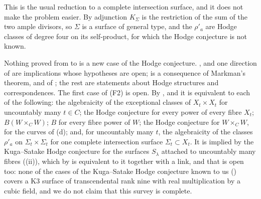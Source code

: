This is the usual reduction to a complete intersection surface, and it does
not make the problem easier. By adjunction $K_{\Sigma}$ is the restriction of
the sum of the two ample divisors, so $\Sigma$ is a surface of general type,
and the $\rho'_{a}$ are Hodge classes of degree four on its self-product, for
which the Hodge conjecture is not known.

\begin{remark}\label{rem:mumfordpowersopen}
Nothing proved from  to  is
a new case of the Hodge conjecture. ,
 and one direction of 
are implications whose hypotheses are open;  is a
consequence of Markman's theorem, and of \cite{Li26}; the rest are statements
about Hodge structures and correspondences. The first case of (F2) is open.
By ,  and
 it is equivalent to each of the following: the
algebraicity of the exceptional classes of $X_{t}\times X_{t}$ for uncountably
many $t\in C$; the Hodge conjecture for every power of every fibre $X_{t}$;
$B(W\times_{C}W)$; $B$ for every fibre power of $W$; the Hodge conjecture for
$W\times_{C}W$, for the curves of (d); and, for
uncountably many $t$, the algebraicity of the classes $\rho'_{a}$ on
$\Sigma_{t}\times\Sigma_{t}$ for one complete intersection surface
$\Sigma_{t}\subset X_{t}$. It is implied by the Kuga--Satake Hodge conjecture
for the surfaces $S_{\lambda}$ attached to uncountably many fibres
((ii)), which by  is equivalent
to it together with a link, and that is open too: none of the cases of the
Kuga--Satake Hodge conjecture known to us () covers a K3
surface of transcendental rank nine with real multiplication by a cubic field,
and we do not claim that this survey is complete.


\end{remark}
